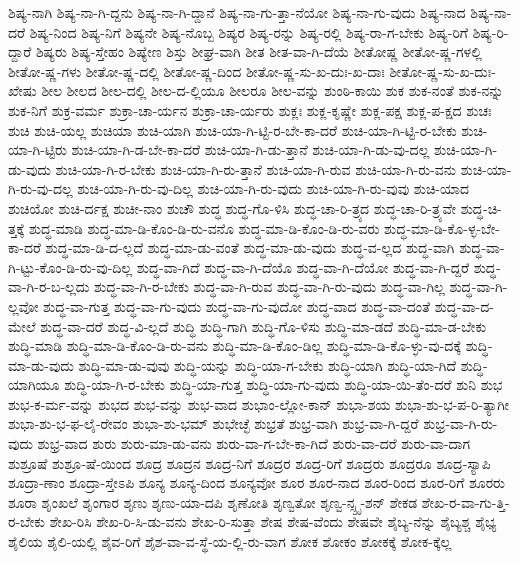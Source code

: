 {ಶಿಷ್ಯ-ನಾಗಿ
ಶಿಷ್ಯ-ನಾ-ಗಿ-ದ್ದನು
ಶಿಷ್ಯ-ನಾ-ಗಿ-ದ್ದಾನೆ
ಶಿಷ್ಯ-ನಾ-ಗು-ತ್ತಾ-ನೆಯೋ
ಶಿಷ್ಯ-ನಾ-ಗು-ವುದು
ಶಿಷ್ಯ-ನಾದ
ಶಿಷ್ಯ-ನಾ-ದರೆ
ಶಿಷ್ಯ-ನಿಂದ
ಶಿಷ್ಯ-ನಿಗೆ
ಶಿಷ್ಯನೇ
ಶಿಷ್ಯ-ನೊಬ್ಬ
ಶಿಷ್ಯರ
ಶಿಷ್ಯ-ರನ್ನು
ಶಿಷ್ಯ-ರಲ್ಲಿ
ಶಿಷ್ಯ-ರಾ-ಗ-ಬೇಕು
ಶಿಷ್ಯ-ರಿಗೆ
ಶಿಷ್ಯ-ರಿ-ದ್ದಾರೆ
ಶಿಷ್ಯರು
ಶಿಷ್ಯ-ಸ್ತೇಹಂ
ಶಿಷ್ಯೇಣ
ಶಿಸ್ತು
ಶೀಘ್ರ-ವಾಗಿ
ಶೀತ
ಶೀತ-ವಾ-ಗಿ-ದೆಯೆ
ಶೀತೋಷ್ಣ
ಶೀತೋ-ಷ್ಣ-ಗಳಲ್ಲಿ
ಶೀತೋ-ಷ್ಣ-ಗಳು
ಶೀತೋ-ಷ್ಣ-ದಲ್ಲಿ
ಶೀತೋ-ಷ್ಣ-ದಿಂದ
ಶೀತೋ-ಷ್ಣ-ಸು-ಖ-ದುಃ-ಖ-ದಾಃ
ಶೀತೋ-ಷ್ಣ-ಸು-ಖ-ದುಃ-ಖೇಷು
ಶೀಲ
ಶೀಲದ
ಶೀಲ-ದಲ್ಲಿ
ಶೀಲ-ದ-ಲ್ಲಿಯೂ
ಶೀಲರೂ
ಶೀಲ-ವನ್ನು
ಶುಂಠಿ-ಕಾಯಿ
ಶುಕ
ಶುಕ-ನಂತೆ
ಶುಕ-ನನ್ನು
ಶುಕ-ನಿಗೆ
ಶುಕ್ರ-ವರ್ಮ
ಶುಕ್ರಾ-ಚಾ-ರ್ಯನ
ಶುಕ್ರಾ-ಚಾ-ರ್ಯರು
ಶುಕ್ಲಃ
ಶುಕ್ಲ-ಕೃಷ್ಣೇ
ಶುಕ್ಲ-ಪಕ್ಷ
ಶುಕ್ಲ-ಪ-ಕ್ಷದ
ಶುಚಃ
ಶುಚಿ
ಶುಚಿ-ಯಲ್ಲ
ಶುಚಿಯಾ
ಶುಚಿ-ಯಾಗಿ
ಶುಚಿ-ಯಾ-ಗಿ-ಟ್ಟಿ-ರ-ಬೇ-ಕಾ-ದರೆ
ಶುಚಿ-ಯಾ-ಗಿ-ಟ್ಟಿ-ರ-ಬೇಕು
ಶುಚಿ-ಯಾ-ಗಿ-ಟ್ಟಿರು
ಶುಚಿ-ಯಾ-ಗಿ-ಡ-ಬೇ-ಕಾ-ದರೆ
ಶುಚಿ-ಯಾ-ಗಿ-ಡು-ತ್ತಾನೆ
ಶುಚಿ-ಯಾ-ಗಿ-ಡು-ವು-ದಲ್ಲ
ಶುಚಿ-ಯಾ-ಗಿ-ಡು-ವುದು
ಶುಚಿ-ಯಾ-ಗಿ-ರ-ಬೇಕು
ಶುಚಿ-ಯಾ-ಗಿ-ರು-ತ್ತಾನೆ
ಶುಚಿ-ಯಾ-ಗಿ-ರುವ
ಶುಚಿ-ಯಾ-ಗಿ-ರು-ವನು
ಶುಚಿ-ಯಾ-ಗಿ-ರು-ವು-ದಲ್ಲ
ಶುಚಿ-ಯಾ-ಗಿ-ರು-ವು-ದಿಲ್ಲ
ಶುಚಿ-ಯಾ-ಗಿ-ರು-ವುದು
ಶುಚಿ-ಯಾ-ಗಿ-ರು-ವುವು
ಶುಚಿ-ಯಾದ
ಶುಚಿಯೋ
ಶುಚಿ-ರ್ದಕ್ಷ
ಶುಚೀ-ನಾಂ
ಶುಚೌ
ಶುದ್ಧ
ಶುದ್ಧ-ಗೊ-ಳಿಸಿ
ಶುದ್ಧ-ಚಾ-ರಿ-ತ್ರ್ಯದ
ಶುದ್ಧ-ಚಾ-ರಿ-ತ್ರ್ಯವೇ
ಶುದ್ಧ-ಚಿ-ತ್ತಕ್ಕೆ
ಶುದ್ಧ-ಮಾಡಿ
ಶುದ್ಧ-ಮಾ-ಡಿ-ಕೊಂ-ಡಿ-ರು-ವನೊ
ಶುದ್ಧ-ಮಾ-ಡಿ-ಕೊಂ-ಡಿ-ರು-ವರು
ಶುದ್ಧ-ಮಾ-ಡಿ-ಕೊ-ಳ್ಳ-ಬೇ-ಕಾ-ದರೆ
ಶುದ್ಧ-ಮಾ-ಡಿ-ದ-ಲ್ಲದೆ
ಶುದ್ಧ-ಮಾ-ಡು-ವಂತೆ
ಶುದ್ಧ-ಮಾ-ಡು-ವುದು
ಶುದ್ಧ-ವ-ಲ್ಲದ
ಶುದ್ಧ-ವಾಗಿ
ಶುದ್ಧ-ವಾ-ಗಿ-ಟ್ಟು-ಕೊಂ-ಡಿ-ರು-ವು-ದಿಲ್ಲ
ಶುದ್ಧ-ವಾ-ಗಿದೆ
ಶುದ್ಧ-ವಾ-ಗಿ-ದೆಯೊ
ಶುದ್ಧ-ವಾ-ಗಿ-ದೆಯೋ
ಶುದ್ಧ-ವಾ-ಗಿ-ದ್ದರೆ
ಶುದ್ಧ-ವಾ-ಗಿ-ರ-ಬ-ಲ್ಲದು
ಶುದ್ಧ-ವಾ-ಗಿ-ರ-ಬೇಕು
ಶುದ್ಧ-ವಾ-ಗಿ-ರುವ
ಶುದ್ಧ-ವಾ-ಗಿ-ರು-ವುದು
ಶುದ್ಧ-ವಾ-ಗಿಲ್ಲ
ಶುದ್ಧ-ವಾ-ಗಿ-ಲ್ಲವೋ
ಶುದ್ಧ-ವಾ-ಗುತ್ತ
ಶುದ್ಧ-ವಾ-ಗು-ವುದು
ಶುದ್ಧ-ವಾ-ಗು-ವುದೋ
ಶುದ್ಧ-ವಾದ
ಶುದ್ಧ-ವಾ-ದಂತೆ
ಶುದ್ಧ-ವಾ-ದ-ಮೇಲೆ
ಶುದ್ಧ-ವಾ-ದರೆ
ಶುದ್ಧ-ವಿ-ಲ್ಲದೆ
ಶುದ್ಧಿ
ಶುದ್ಧಿ-ಗಾಗಿ
ಶುದ್ಧಿ-ಗೊ-ಳಿಸು
ಶುದ್ಧಿ-ಮಾ-ಡದೆ
ಶುದ್ಧಿ-ಮಾ-ಡ-ಬೇಕು
ಶುದ್ಧಿ-ಮಾಡಿ
ಶುದ್ಧಿ-ಮಾ-ಡಿ-ಕೊಂ-ಡಿ-ರು-ವನು
ಶುದ್ಧಿ-ಮಾ-ಡಿ-ಕೊಂ-ಡಿಲ್ಲ
ಶುದ್ಧಿ-ಮಾ-ಡಿ-ಕೊ-ಳ್ಳು-ವು-ದಕ್ಕೆ
ಶುದ್ಧಿ-ಮಾ-ಡು-ವುದು
ಶುದ್ಧಿ-ಮಾ-ಡು-ವುವು
ಶುದ್ಧಿ-ಯನ್ನು
ಶುದ್ಧಿ-ಯಾ-ಗ-ಬೇಕು
ಶುದ್ಧಿ-ಯಾಗಿ
ಶುದ್ಧಿ-ಯಾ-ಗಿದೆ
ಶುದ್ಧಿ-ಯಾಗಿಯೂ
ಶುದ್ಧಿ-ಯಾ-ಗಿ-ರ-ಬೇಕು
ಶುದ್ಧಿ-ಯಾ-ಗುತ್ತ
ಶುದ್ಧಿ-ಯಾ-ಗು-ವುದು
ಶುದ್ಧಿ-ಯಾ-ಯಿ-ತೆಂ-ದರೆ
ಶುನಿ
ಶುಭ
ಶುಭ-ಕ-ರ್ಮ-ವನ್ನು
ಶುಭದ
ಶುಭ-ವನ್ನು
ಶುಭ-ವಾದ
ಶುಭಾಂ-ಲ್ಲೋ-ಕಾನ್
ಶುಭಾ-ಶಯ
ಶುಭಾ-ಶು-ಭ-ಪ-ರಿ-ತ್ಯಾಗೀ
ಶುಭಾ-ಶು-ಭ-ಫ-ಲೈ-ರೇವಂ
ಶುಭಾ-ಶು-ಭಮ್
ಶುಭೇಚ್ಛೆ
ಶುಭ್ರತೆ
ಶುಭ್ರ-ವಾಗಿ
ಶುಭ್ರ-ವಾ-ಗಿ-ದ್ದರೆ
ಶುಭ್ರ-ವಾ-ಗಿ-ರು-ವುದು
ಶುಭ್ರ-ವಾದ
ಶುರು
ಶುರು-ಮಾ-ಡು-ವನು
ಶುರು-ವಾ-ಗ-ಬೇ-ಕಾ-ಗಿದೆ
ಶುರು-ವಾ-ದರೆ
ಶುರು-ವಾ-ದಾಗ
ಶುಶ್ರೂಷೆ
ಶುಶ್ರೂ-ಷೆ-ಯಿಂದ
ಶೂದ್ರ
ಶೂದ್ರನ
ಶೂದ್ರ-ನಿಗೆ
ಶೂದ್ರರ
ಶೂದ್ರ-ರಿಗೆ
ಶೂದ್ರರು
ಶೂದ್ರರೂ
ಶೂದ್ರ-ಸ್ಯಾಪಿ
ಶೂದ್ರಾ-ಣಾಂ
ಶೂದ್ರಾ-ಸ್ತೇಽಪಿ
ಶೂನ್ಯ
ಶೂನ್ಯ-ದಿಂದ
ಶೂನ್ಯವೋ
ಶೂರ
ಶೂರ-ನಾದ
ಶೂರ-ರಿಂದ
ಶೂರ-ರಿಗೆ
ಶೂರರು
ಶೂರಾ
ಶೃಂಖಲೆ
ಶೃಂಗಾರ
ಶೃಣು
ಶೃಣು-ಯಾ-ದಪಿ
ಶೃಣೋತಿ
ಶೃಣ್ವತೋ
ಶೃಣ್ವ-ನ್ಸ್ಪೃ-ಶನ್
ಶೇಕಡ
ಶೇಖ-ರ-ವಾ-ಗು-ತ್ತಿ-ರ-ಬೇಕು
ಶೇಖ-ರಿಸಿ
ಶೇಖ-ರಿ-ಸಿ-ಡು-ವನು
ಶೇಖ-ರಿ-ಸುತ್ತಾ
ಶೇಷ
ಶೇಷ-ವೆಂದು
ಶೇಷವೇ
ಶೈಬ್ಯ-ನೆನ್ನು
ಶೈಬ್ಯಶ್ಚ
ಶೈಭ್ಯ
ಶೈಲಿಯ
ಶೈಲಿ-ಯಲ್ಲಿ
ಶೈವ-ರಿಗೆ
ಶೈಶ-ವಾ-ವ-ಸ್ಥೆ-ಯ-ಲ್ಲಿ-ರು-ವಾಗ
ಶೋಕ
ಶೋಕಂ
ಶೋಕಕ್ಕೆ
ಶೋಕ-ಕ್ಕೆಲ್ಲ
}
